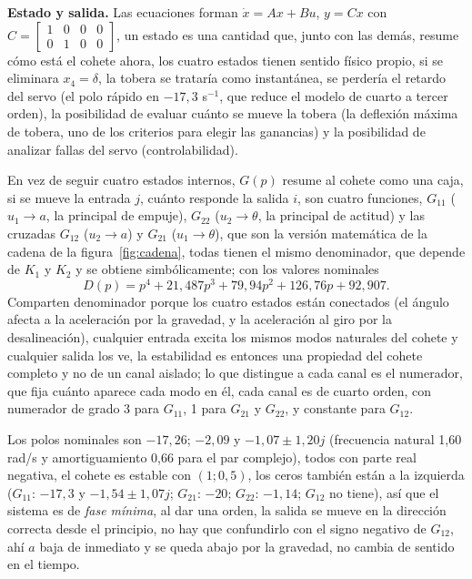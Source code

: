 \documentclass[article, 11pt]{IEEEtran}   %
\begin{document}
\textbf{Estado y salida.} Las ecuaciones forman $\dot x=Ax+Bu$, $y=Cx$ con $C=\begin{bmatrix}1&0&0&0\\0&1&0&0\end{bmatrix}$, un estado es una cantidad que, junto con las dem\'as, resume c\'omo est\'a el cohete ahora, los cuatro estados tienen sentido f\'isico propio, si se eliminara $x_4=\delta$, la tobera se tratar\'ia como instant\'anea, se perder\'ia el retardo del servo (el polo r\'apido en $-17{,}3$ s$^{-1}$, que reduce el modelo de cuarto a tercer orden), la posibilidad de evaluar cu\'anto se mueve la tobera (la deflexi\'on m\'axima de tobera, uno de los criterios para elegir las ganancias) y la posibilidad de analizar fallas del servo (controlabilidad).

En vez de seguir cuatro estados internos, $G(p)$ resume al cohete como una caja, si se mueve la entrada $j$, cu\'anto responde la salida $i$, son cuatro funciones, $G_{11}$ ($u_1\to a$, la principal de empuje), $G_{22}$ ($u_2\to\theta$, la principal de actitud) y las cruzadas $G_{12}$ ($u_2\to a$) y $G_{21}$ ($u_1\to\theta$), que son la versi\'on matem\'atica de la cadena de la figura~\ref{fig:cadena}, todas tienen el mismo denominador, que depende de $K_1$ y $K_2$ y se obtiene simb\'olicamente; con los valores nominales
\begin{equation}
D(p)=p^4+21{,}487p^3+79{,}94p^2+126{,}76p+92{,}907.
\end{equation}
Comparten denominador porque los cuatro estados est\'an conectados (el \'angulo afecta a la aceleraci\'on por la gravedad, y la aceleraci\'on al giro por la desalineaci\'on), cualquier entrada excita los mismos modos naturales del cohete y cualquier salida los ve, la estabilidad es entonces una propiedad del cohete completo y no de un canal aislado; lo que distingue a cada canal es el numerador, que fija cu\'anto aparece cada modo en \'el, cada canal es de cuarto orden, con numerador de grado 3 para $G_{11}$, 1 para $G_{21}$ y $G_{22}$, y constante para $G_{12}$.

Los polos nominales son $-17{,}26$; $-2{,}09$ y $-1{,}07\pm1{,}20j$ (frecuencia natural 1,60 rad/s y amortiguamiento 0,66 para el par complejo), todos con parte real negativa, el cohete es estable con $(1;0{,}5)$, los ceros tambi\'en est\'an a la izquierda ($G_{11}$: $-17{,}3$ y $-1{,}54\pm1{,}07j$; $G_{21}$: $-20$; $G_{22}$: $-1{,}14$; $G_{12}$ no tiene), as\'i que el sistema es de \emph{fase m\'inima}, al dar una orden, la salida se mueve en la direcci\'on correcta desde el principio, no hay que confundirlo con el signo negativo de $G_{12}$, ah\'i $a$ baja de inmediato y se queda abajo por la gravedad, no cambia de sentido en el tiempo.
\end{document}
